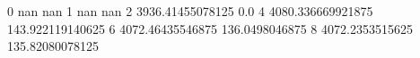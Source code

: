 0 nan nan
1 nan nan
2 3936.41455078125 0.0
4 4080.336669921875 143.922119140625
6 4072.46435546875 136.0498046875
8 4072.2353515625 135.82080078125
